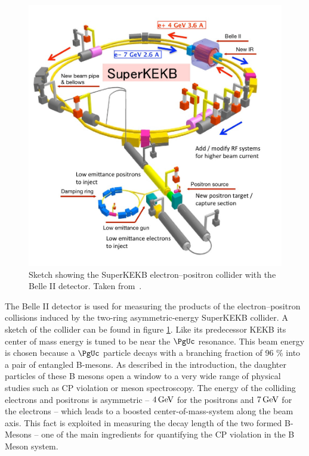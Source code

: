 \begin{figure}
 \centering
 \includegraphics[height=0.4\textheight]{figures/experimental_setup/superkekb.jpg}
 \caption[Sketch showing the SuperKEKB electron--positron collider.]{Sketch showing the SuperKEKB electron--positron collider with the Belle II detector. Taken from~\cite{DesyWebseite}.}
 \label{fig-superkekb}
\end{figure}


The Belle II detector is used for measuring the products of the electron--positron collisions induced by the two-ring asymmetric-energy SuperKEKB collider. A sketch of the collider can be found in figure \ref{fig-superkekb}. Like its predecessor KEKB its center of mass energy is tuned to be near the $\PgUc$ resonance. This beam energy is chosen because a $\PgUc$ particle decays with a branching fraction of 96 \% into a pair of entangled B-mesons. As described in the introduction, the daughter particles of these B mesons open a window to a very wide range of physical studies such as CP violation or meson spectroscopy. The energy of the colliding electrons and positrons is asymmetric -- $\unit[4]{GeV}$ for the positrons and $\unit[7]{GeV}$ for the electrons -- which leads to a boosted center-of-mass-system along the beam axis. This fact is exploited in measuring the decay length of the two formed B-Mesons -- one of the main ingredients for quantifying the CP violation in the B Meson system. 

